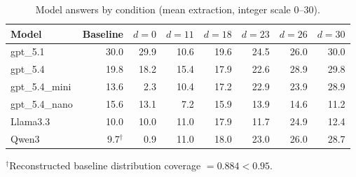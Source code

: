 \begin{table}[t]
\centering
\caption{Model answers by condition (mean extraction, integer scale 0--30).}
\label{tab:core_answers}
\small
\begin{tabular}{lrrrrrrr}
\toprule
Model & Baseline & $d{=}0$ & $d{=}11$ & $d{=}18$ & $d{=}23$ & $d{=}26$ & $d{=}30$ \\
\midrule
gpt\_5.1 & 30.0 & 29.9 & 10.6 & 19.6 & 24.5 & 26.0 & 30.0 \\
gpt\_5.4 & 19.8 & 18.2 & 15.4 & 17.9 & 22.6 & 28.9 & 29.8 \\
gpt\_5.4\_mini & 13.6 & 2.3 & 10.4 & 17.2 & 22.9 & 23.9 & 28.9 \\
gpt\_5.4\_nano & 15.6 & 13.1 & 7.2 & 15.9 & 13.9 & 14.6 & 11.2 \\
Llama3.3 & 10.0 & 10.0 & 11.0 & 17.9 & 11.7 & 24.9 & 12.4 \\
Qwen3 & 9.7$^{\dagger}$ & 0.9 & 11.0 & 18.0 & 23.0 & 26.0 & 28.7 \\
\bottomrule
\end{tabular}

\smallskip
{\footnotesize $^{\dagger}$Reconstructed baseline distribution coverage $=0.884 < 0.95$.}
\end{table}
